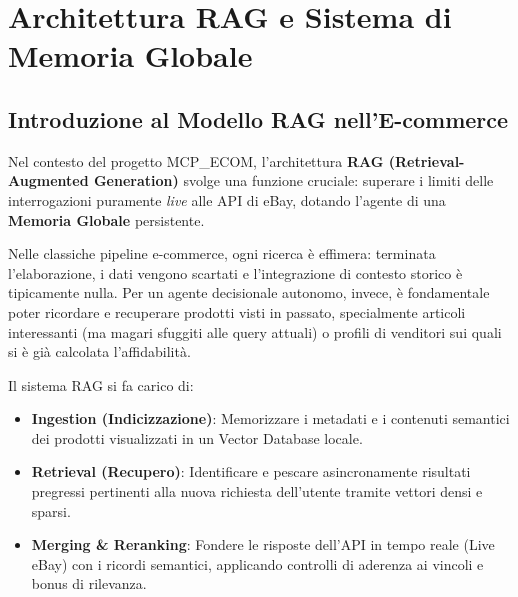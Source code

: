 
\chapter{Architettura RAG e Sistema di Memoria Globale}
\label{chap:rag}

\section{Introduzione al Modello RAG nell'E-commerce}
\label{sec:rag-intro}

Nel contesto del progetto MCP\_ECOM, l'architettura \textbf{RAG (Retrieval-Augmented Generation)} svolge una funzione cruciale: superare i limiti delle interrogazioni puramente \textit{live} alle API di eBay, dotando l'agente di una \textbf{Memoria Globale} persistente.

Nelle classiche pipeline e-commerce, ogni ricerca è effimera: terminata l'elaborazione, i dati vengono scartati e l'integrazione di contesto storico è tipicamente nulla. Per un agente decisionale autonomo, invece, è fondamentale poter ricordare e recuperare prodotti visti in passato, specialmente articoli interessanti (ma magari sfuggiti alle query attuali) o profili di venditori sui quali si è già calcolata l'affidabilità. 

Il sistema RAG si fa carico di:
\begin{itemize}
    \item \textbf{Ingestion (Indicizzazione)}: Memorizzare i metadati e i contenuti semantici dei prodotti visualizzati in un Vector Database locale.
    \item \textbf{Retrieval (Recupero)}: Identificare e pescare asincronamente risultati pregressi pertinenti alla nuova richiesta dell'utente tramite vettori densi e sparsi.
    \item \textbf{Merging \& Reranking}: Fondere le risposte dell'API in tempo reale (Live eBay) con i ricordi semantici, applicando controlli di aderenza ai vincoli e bonus di rilevanza.
\end{itemize}

